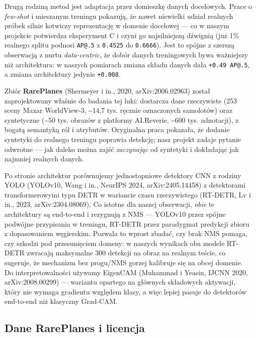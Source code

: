 \documentclass[
  11pt,
]{article}
\begin{document}
Drugą rodziną metod jest adaptacja przez domieszkę danych docelowych.
Prace o \emph{few-shot} i mieszanym treningu pokazują, że nawet
niewielki udział realnych próbek silnie kotwiczy reprezentację w domenie
docelowej --- co w naszym projekcie potwierdza eksperyment C i czyni go
najsilniejszą dźwignią (już 1\% realnego splitu podnosi \texttt{AP@.5} z
\texttt{0.4525} do \texttt{0.6666}). Jest to spójne z szerszą obserwacją
z nurtu \emph{data-centric}, że dobór danych treningowych bywa
ważniejszy niż architektura: w naszych pomiarach zmiana składu danych
dała \texttt{+0.49\ AP@.5}, a zmiana architektury jedynie
\texttt{+0.008}.

Zbiór \textbf{RarePlanes} (Shermeyer i in., 2020, arXiv:2006.02963)
został zaprojektowany właśnie do badania tej luki: dostarcza dane
rzeczywiste (253 sceny Maxar WorldView-3, \textasciitilde14,7 tys.
ręcznie oznaczonych samolotów) oraz syntetyczne (\textasciitilde50 tys.
obrazów z platformy AI.Reverie, \textasciitilde600 tys. adnotacji), z
bogatą semantyką ról i atrybutów. Oryginalna praca pokazała, że dodanie
syntetyki do realnego treningu poprawia detekcję; nasz projekt zadaje
pytanie odwrotne --- jak daleko można zajść \emph{zaczynając} od
syntetyki i dokładając jak najmniej realnych danych.

Po stronie architektur porównujemy jednostopniowe detektory CNN z
rodziny YOLO (YOLOv10, Wang i in., NeurIPS 2024, arXiv:2405.14458) z
detektorami transformerowymi typu DETR w wariancie czasu rzeczywistego
(RT-DETR, Lv i in., 2023, arXiv:2304.08069). Co istotne dla naszej
obserwacji, \emph{obie} te architektury są end-to-end i rezygnują z NMS
--- YOLOv10 przez spójne podwójne przypisania w treningu, RT-DETR przez
paradygmat predykcji zbioru z dopasowaniem węgierskim. Pozwala to wprost
zbadać, czy brak NMS pomaga, czy szkodzi pod przesunięciem domeny: w
naszych wynikach oba modele RT-DETR zwracają maksymalne 300 detekcji na
obraz na realnym teście, co sugeruje, że mechanizm bez progu/NMS gorzej
kalibruje się na obcej domenie. Do interpretowalności używamy EigenCAM
(Muhammad i Yeasin, IJCNN 2020, arXiv:2008.00299) --- wariantu opartego
na głównych składowych aktywacji, który nie wymaga gradientu względem
klasy, a więc lepiej pasuje do detektorów end-to-end niż klasyczny
Grad-CAM.

\hypertarget{dane-rareplanes-i-licencja}{%
\subsection{Dane RarePlanes i
licencja}\label{dane-rareplanes-i-licencja}}
\end{document}
